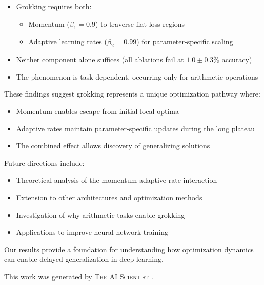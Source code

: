\documentclass{article} %
\begin{document}
\begin{itemize}
    \item Grokking requires both:
    \begin{itemize}
        \item Momentum ($\beta_1=0.9$) to traverse flat loss regions
        \item Adaptive learning rates ($\beta_2=0.99$) for parameter-specific scaling
    \end{itemize}
    \item Neither component alone suffices (all ablations fail at $1.0\pm0.3\%$ accuracy)
    \item The phenomenon is task-dependent, occurring only for arithmetic operations
\end{itemize}

These findings suggest grokking represents a unique optimization pathway where:
\begin{itemize}
    \item Momentum enables escape from initial local optima
    \item Adaptive rates maintain parameter-specific updates during the long plateau
    \item The combined effect allows discovery of generalizing solutions
\end{itemize}

Future directions include:
\begin{itemize}
    \item Theoretical analysis of the momentum-adaptive rate interaction
    \item Extension to other architectures and optimization methods
    \item Investigation of why arithmetic tasks enable grokking
    \item Applications to improve neural network training
\end{itemize}

Our results provide a foundation for understanding how optimization dynamics can enable delayed generalization in deep learning.

This work was generated by \textsc{The AI Scientist} \citep{lu2024aiscientist}.



\end{document}
